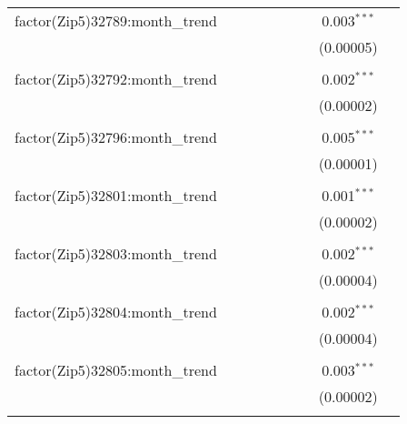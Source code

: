 \begin{table}[H]
{\begin{tabular}{@{\extracolsep{5pt}}lcccccccc}
  factor(Zip5)32789:month\_trend &  &  &  &  &  &  & 0.003$^{***}$ &  \\  

   &  &  &  &  &  &  & (0.00005) &  \\  

   & & & & & & & & \\  

  factor(Zip5)32792:month\_trend &  &  &  &  &  &  & 0.002$^{***}$ &  \\  

   &  &  &  &  &  &  & (0.00002) &  \\  

   & & & & & & & & \\  

  factor(Zip5)32796:month\_trend &  &  &  &  &  &  & 0.005$^{***}$ &  \\  

   &  &  &  &  &  &  & (0.00001) &  \\  

   & & & & & & & & \\  

  factor(Zip5)32801:month\_trend &  &  &  &  &  &  & 0.001$^{***}$ &  \\  

   &  &  &  &  &  &  & (0.00002) &  \\  

   & & & & & & & & \\  

  factor(Zip5)32803:month\_trend &  &  &  &  &  &  & 0.002$^{***}$ &  \\  

   &  &  &  &  &  &  & (0.00004) &  \\  

   & & & & & & & & \\  

  factor(Zip5)32804:month\_trend &  &  &  &  &  &  & 0.002$^{***}$ &  \\  

   &  &  &  &  &  &  & (0.00004) &  \\  

   & & & & & & & & \\  

  factor(Zip5)32805:month\_trend &  &  &  &  &  &  & 0.003$^{***}$ &  \\  

   &  &  &  &  &  &  & (0.00002) &  \\  

   & & & & & & & & \\  


\end{tabular}}
\end{table}
